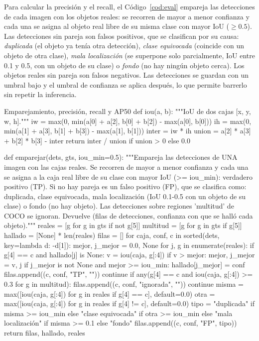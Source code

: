 \documentclass[11pt,letterpaper]{article}
\begin{document}
Para calcular la precisión y el recall, el Código~\ref{cod:eval} empareja las detecciones de cada imagen con los objetos reales: se recorren de mayor a menor confianza y cada una se asigna al objeto real libre de su misma clase con mayor IoU ($\geq 0.5$). Las detecciones sin pareja son falsos positivos, que se clasifican por su causa: \textit{duplicada} (el objeto ya tenía otra detección), \textit{clase equivocada} (coincide con un objeto de otra clase), \textit{mala localización} (se superpone solo parcialmente, IoU entre 0.1 y 0.5, con un objeto de su clase) o \textit{fondo} (no hay ningún objeto cerca). Los objetos reales sin pareja son falsos negativos. Las detecciones se guardan con un umbral bajo y el umbral de confianza se aplica después, lo que permite barrerlo sin repetir la inferencia.

\begin{codigo}[label=cod:eval]{Emparejamiento, precisión, recall y AP50}
def iou(a, b):
    """IoU de dos cajas [x, y, w, h]."""
    iw = max(0, min(a[0] + a[2], b[0] + b[2]) - max(a[0], b[0]))
    ih = max(0, min(a[1] + a[3], b[1] + b[3]) - max(a[1], b[1]))
    inter = iw * ih
    union = a[2] * a[3] + b[2] * b[3] - inter
    return inter / union if union > 0 else 0.0


def emparejar(dets, gts, iou_min=0.5):
    """Empareja las detecciones de UNA imagen con las cajas reales. Se recorren de mayor a menor confianza y
    cada una se asigna a la caja real libre de su clase con mayor IoU (>= iou_min): verdadero positivo (TP).
    Si no hay pareja es un falso positivo (FP), que se clasifica como: duplicada, clase equivocada,
    mala localización (IoU 0.1-0.5 con un objeto de su clase) o fondo (no hay objeto). Las detecciones sobre
    regiones 'multitud' de COCO se ignoran. Devuelve (filas de detecciones, confianza con que se halló cada objeto)."""
    reales = [g for g in gts if not g[5]]
    multitud = [g for g in gts if g[5]]
    hallado = [None] * len(reales)
    filas = []
    for caja, conf, c in sorted(dets, key=lambda d: -d[1]):
        mejor, j_mejor = 0.0, None
        for j, g in enumerate(reales):
            if g[4] == c and hallado[j] is None:
                v = iou(caja, g[:4])
                if v > mejor:
                    mejor, j_mejor = v, j
        if j_mejor is not None and mejor >= iou_min:
            hallado[j_mejor] = conf
            filas.append((c, conf, "TP", ""))
            continue
        if any(g[4] == c and iou(caja, g[:4]) >= 0.3 for g in multitud):
            filas.append((c, conf, "ignorada", ""))
            continue
        misma = max([iou(caja, g[:4]) for g in reales if g[4] == c], default=0.0)
        otra = max([iou(caja, g[:4]) for g in reales if g[4] != c], default=0.0)
        tipo = "duplicada" if misma >= iou_min else "clase equivocada" if otra >= iou_min else "mala localización" if misma >= 0.1 else "fondo"
        filas.append((c, conf, "FP", tipo))
    return filas, hallado, reales



\end{codigo}
\end{document}
